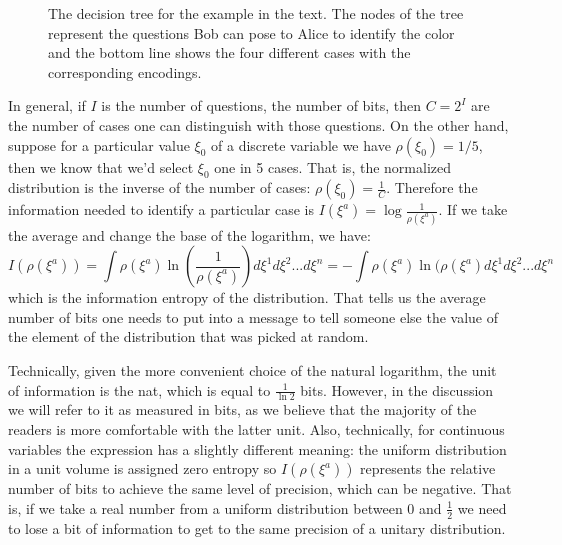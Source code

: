 \documentclass[11pt]{article}
\begin{document}
\begin{figure}\label{twoQuestions}
	\centering
{}
\caption{The decision tree for the example in the text. The nodes of the tree represent the questions Bob can pose to Alice to identify the color and the bottom line shows the four different cases with the corresponding encodings.}
\end{figure}


In general, if $I$ is the number of questions, the number of bits, then $C = 2 ^ I$ are the number of cases one can distinguish with those questions. On the other hand, suppose for a particular value $\xi_0$ of a discrete variable we have $\rho(\xi_0)=1/5$, then we know that we'd select $\xi_0$ one in 5 cases. That is, the normalized distribution is the inverse of the number of cases: $\rho(\xi_0) = \frac{1}{C}$.  Therefore the information needed to identify a particular case is $I(\xi^a)=\log \frac{1}{\rho(\xi^a)}$. If we take the average and change the base of the logarithm, we have:
\begin{equation}
I(\rho(\xi^a)) = \int \rho(\xi^a) \ln \left(\frac{1}{\rho(\xi^a)}\right) d\xi^1 d\xi^2 ... d\xi^n =-\int \rho(\xi^a) \ln (\rho(\xi^a) d\xi^1 d\xi^2 ... d\xi^n
\end{equation}
which is the information entropy of the distribution. That tells us the average number of bits one needs to put into a message to tell someone else the value of the element of the distribution that was picked at random.

Technically, given the more convenient choice of the natural logarithm, the unit of information is the nat, which is equal to $\frac{1}{\ln 2}$ bits. However, in the discussion we will refer to it as measured in bits, as we believe that the majority of the readers is more comfortable with the latter unit. Also, technically, for continuous variables the expression has a slightly different meaning: the uniform distribution in a unit volume is assigned zero entropy so $I(\rho(\xi^a))$ represents the relative number of bits to achieve the same level of precision, which can be negative. That is, if we take a real number from a uniform distribution between 0 and $\frac{1}{2}$ we need to lose a bit of information to get to the same precision of a unitary distribution.
\end{document}
